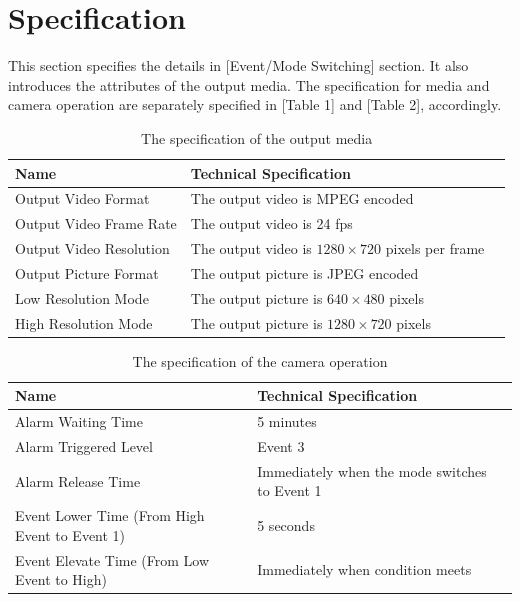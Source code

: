 \documentclass{article}
\begin{document}
\section{Specification}
\indent This section specifies the details in [Event/Mode Switching] section. It also introduces the attributes of the output media. The specification for media and camera operation are separately specified in [Table 1] and [Table 2], accordingly.
\begin{table}[h]

\begin{tabular}{ | l | l | l |}
    \hline
     Name & Technical Specification \\ \hline
     Output Video Format & The output video is MPEG encoded \\ \hline
     Output Video Frame Rate & The output video is 24 fps \\ \hline
     Output Video Resolution & The output video is $1280\times720$ pixels per frame\\ \hline
     Output Picture Format & The output picture is JPEG encoded \\ \hline
     Low Resolution Mode & The output picture is $640\times480$ pixels \\ \hline
     High Resolution Mode & The output picture is $1280\times720$ pixels \\ \hline
\end{tabular}

    \caption{The specification of the output media}
\end{table}

\begin{table}[h]
\begin{tabular}{ | l | l | l |}
    \hline
     Name & Technical Specification \\ \hline
     Alarm Waiting Time & 5 minutes \\ \hline
     Alarm Triggered Level & Event 3 \\ \hline
     Alarm Release Time & Immediately when the mode switches to Event 1 \\ \hline
     Event Lower   Time (From High Event to Event 1) & 5 seconds \\ \hline
     Event Elevate Time (From Low Event to High) & Immediately when condition meets\\ \hline
\end{tabular}

    \caption{The specification of the camera operation}
\end{table}
\end{document}
